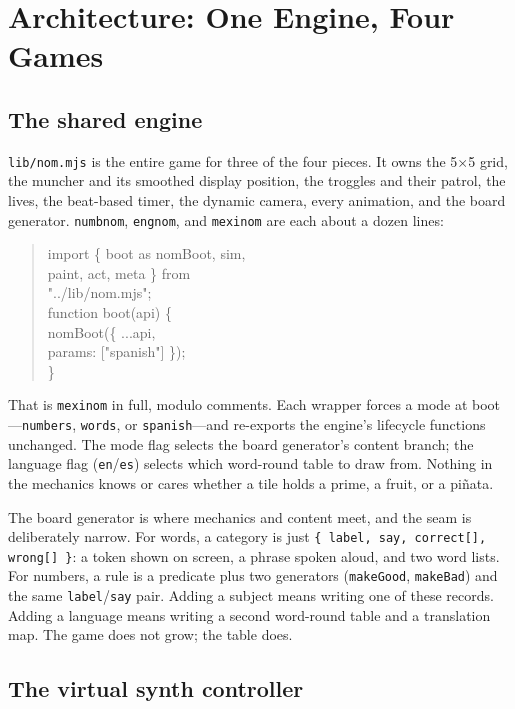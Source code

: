 \documentclass[10pt,letterpaper,twocolumn]{article}
\begin{document}
\section{Architecture: One Engine, Four Games}

\subsection{The shared engine}

\texttt{lib/nom.mjs} is the entire game for three of the four pieces. It owns the 5$\times$5 grid, the muncher and its smoothed display position, the troggles and their patrol, the lives, the beat-based timer, the dynamic camera, every animation, and the board generator. \texttt{numbnom}, \texttt{engnom}, and \texttt{mexinom} are each about a dozen lines:

\begin{quote}\small\ttfamily
import \{ boot as nomBoot, sim,\\
\hphantom{im}paint, act, meta \} from\\
\hphantom{im}"../lib/nom.mjs";\\[0.3em]
function boot(api) \{\\
\hphantom{im}nomBoot(\{ ...api,\\
\hphantom{imim}params: ["spanish"] \});\\
\}
\end{quote}

That is \texttt{mexinom} in full, modulo comments. Each wrapper forces a mode at boot---\texttt{numbers}, \texttt{words}, or \texttt{spanish}---and re-exports the engine's lifecycle functions unchanged. The mode flag selects the board generator's content branch; the language flag (\texttt{en}/\texttt{es}) selects which word-round table to draw from. Nothing in the mechanics knows or cares whether a tile holds a prime, a fruit, or a piñata.

The board generator is where mechanics and content meet, and the seam is deliberately narrow. For words, a category is just \verb|{ label, say, correct[], wrong[] }|: a token shown on screen, a phrase spoken aloud, and two word lists. For numbers, a rule is a predicate plus two generators (\verb|makeGood|, \verb|makeBad|) and the same \verb|label|/\verb|say| pair. Adding a subject means writing one of these records. Adding a language means writing a second word-round table and a translation map. The game does not grow; the table does.

\subsection{The virtual synth controller}
\end{document}
